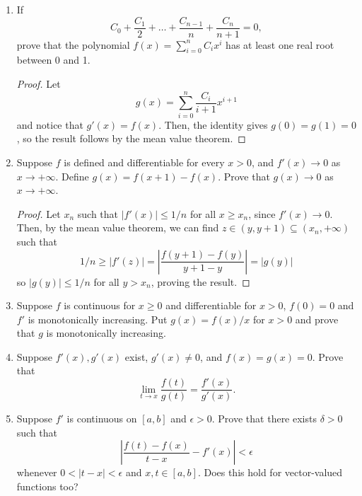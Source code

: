 \begin{enumerate}[1.]
    \begin{proof}
        If $M = 0$, this is trivial. Otherwise, choose $\epsilon < 1/M$ so that $f'(x) = 1 + \epsilon g'(x) \ge 1 + \epsilon (-M) > 0$, and thus $f$ is strictly increasing and thus one-to-one.
    \end{proof}

\item %
    If
    \[
        C_0 + \frac{C_1}{2} + \dotsc + \frac{C_{n-1}}{n} + \frac{C_n}{n + 1} = 0,
    \]
    prove that the polynomial $f(x) = \sum_{i=0}^{n} C_ix^i$ has at least one real root between 0 and 1.

    \begin{proof}
        Let 
        \[
            g(x) = \sum_{i=0}^{n} \frac{C_i}{i+1} x^{i+1}
        \]
        and notice that $g'(x) = f(x)$. Then, the identity gives $g(0) = g(1) = 0$, so the result follows by the mean value theorem.
    \end{proof}

\item %
    Suppose $f$ is defined and differentiable for every $x > 0$, and $f'(x) \to 0$ as $x \to +\infty$. Define $g(x) = f(x + 1) - f(x)$. Prove that $g(x) \to 0$ as $x \to +\infty$.

    \begin{proof}
        Let $x_n$ such that $|f'(x)| \le 1/n$ for all $x \ge x_n$, since $f'(x) \to 0$. Then, by the mean value theorem, we can find $z \in (y, y + 1) \subseteq (x_n, +\infty)$ such that 
        \[
            1/n \ge |f'(z)| = \left|\frac{f(y + 1) - f(y)}{y + 1 - y}\right| = |g(y)|
        \]
        so $|g(y)| \le 1/n$ for all $y > x_n$, proving the result.
    \end{proof}

\item %
    Suppose $f$ is continuous for $x \ge 0$ and differentiable for $x > 0$, $f(0) = 0$ and $f'$ is monotonically increasing. Put $g(x) = f(x) / x$ for $x > 0$ and prove that $g$ is monotonically increasing.

    \TODO
\item %
    Suppose $f'(x), g'(x)$ exist, $g'(x) \ne 0$, and $f(x) = g(x) = 0$. Prove that
    \[
        \lim_{t \to x} \frac{f(t)}{g(t)} = \frac{f'(x)}{g'(x)}.
    \]

    \TODO

\item %
    Suppose $f'$ is continuous on $[a, b]$ and $\epsilon > 0$. Prove that there exists $\delta > 0$ such that
    \[
        \left| \frac{f(t) - f(x)}{t - x} - f'(x) \right| < \epsilon
    \]
    whenever $0 < |t - x| < \epsilon$ and $x, t \in [a, b]$. Does this hold for vector-valued functions too?


\end{enumerate}
